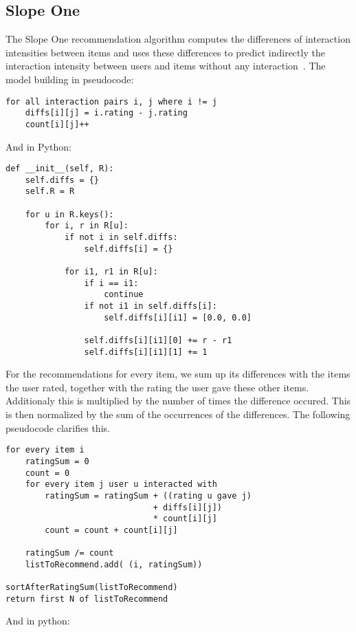 \subsection{Slope One}
The Slope One recommendation algorithm computes the differences of
interaction intensities between items and uses these differences to 
predict indirectly the interaction intensity between users and items
without any interaction~\cite{DBLP:journals/corr/abs-cs-0702144}.
The model building in pseudocode:
\begin{lstlisting}[style=pseudocode]
for all interaction pairs i, j where i != j
    diffs[i][j] = i.rating - j.rating
    count[i][j]++
\end{lstlisting}
And in Python:
\begin{lstlisting}[style=python]
def __init__(self, R):
    self.diffs = {}
    self.R = R

    for u in R.keys():
        for i, r in R[u]:
            if not i in self.diffs:
                self.diffs[i] = {}

            for i1, r1 in R[u]:
                if i == i1:
                    continue
                if not i1 in self.diffs[i]:
                    self.diffs[i][i1] = [0.0, 0.0]

                self.diffs[i][i1][0] += r - r1
                self.diffs[i][i1][1] += 1
\end{lstlisting}
For the recommendations for every item, we sum up its differences with
the items the user rated, together with the rating the user gave these
other items. Additionaly this is multiplied by the number of times the
difference occured. This is then normalized by the sum of the occurrences
of the differences. The following pseudocode clarifies this.
\begin{lstlisting}[style=pseudocode]
for every item i
    ratingSum = 0
    count = 0
    for every item j user u interacted with
        ratingSum = ratingSum + ((rating u gave j) 
                              + diffs[i][j])
                              * count[i][j]
        count = count + count[i][j]

    ratingSum /= count
    listToRecommend.add( (i, ratingSum))

sortAfterRatingSum(listToRecommend)
return first N of listToRecommend
\end{lstlisting}
And in python:

